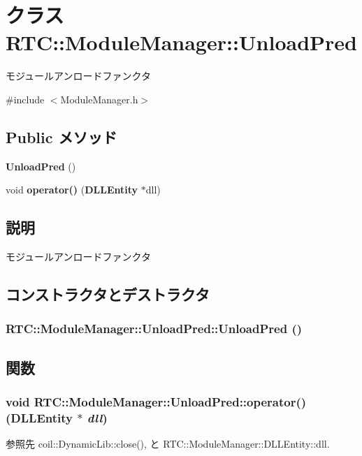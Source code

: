 \section{クラス RTC::ModuleManager::UnloadPred}
\label{classRTC_1_1ModuleManager_1_1UnloadPred}


モジュールアンロードファンクタ  




{\ttfamily \#include $<$ModuleManager.h$>$}

\subsection*{Public メソッド}
\begin{DoxyCompactItemize}
\item 
{\bf UnloadPred} ()
\item 
void {\bf operator()} ({\bf DLLEntity} $\ast$dll)
\end{DoxyCompactItemize}


\subsection{説明}
モジュールアンロードファンクタ 

\subsection{コンストラクタとデストラクタ}
\subsubsection[{UnloadPred}]{\setlength{\rightskip}{0pt plus 5cm}RTC::ModuleManager::UnloadPred::UnloadPred ()\hspace{0.3cm}{\ttfamily  [inline]}}\label{classRTC_1_1ModuleManager_1_1UnloadPred_a15b19c95fe3ce5851e521af92260f226}


\subsection{関数}
\subsubsection[{operator()}]{\setlength{\rightskip}{0pt plus 5cm}void RTC::ModuleManager::UnloadPred::operator() ({\bf DLLEntity} $\ast$ {\em dll})\hspace{0.3cm}{\ttfamily  [inline]}}\label{classRTC_1_1ModuleManager_1_1UnloadPred_acccf2b1a74cee5b7aaaa306298b7d6c0}


参照先 coil::DynamicLib::close(), と RTC::ModuleManager::DLLEntity::dll.

